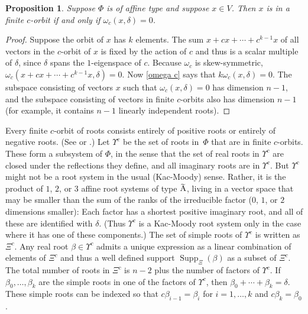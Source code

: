 \documentclass{amsart}
\newtheorem{proposition}{Proposition}[section]
\theoremstyle{definition}
\theoremstyle{remark}
\numberwithin{equation}{section}
\newcommand{\0}{{\mathbf{0}}}
\newcommand{\RSChar}{\Phi}
\newcommand{\RS}{\RSChar}
\newcommand{\RSTChar}{\Upsilon}
\newcommand{\RST}[1]{\RSTChar^{#1}}
\newcommand{\SimplesTChar}{\Xi}
\newcommand{\SimplesT}[1]{\SimplesTChar^{#1}}
\newcommand{\SuppT}{\operatorname{Supp}_\SimplesTChar}
\newcommand{\afftype}[1]{{\widetilde{\raisebox{0pt}[6pt][0pt]{#1}}}}
\begin{document}

\begin{proposition}\label{om del fin}
Suppose $\RS$ is of affine type and suppose $x\in V$.
Then $x$ is in a finite $c$-orbit if and only if $\omega_c(x,\delta)=0$.
\end{proposition}
\begin{proof}
Suppose the orbit of $x$ has $k$ elements.
The sum $x+cx+\cdots+c^{k-1}x$ of all vectors in the $c$-orbit of $x$ is fixed by the action of $c$ and thus is a scalar multiple of $\delta$, since $\delta$ spans the $1$-eigenspace of $c$.
Because $\omega_c$ is skew-symmetric, $\omega_c(x+cx+\cdots+c^{k-1}x,\delta)=0$.
Now \cref{omega c} says that $k\omega_c(x,\delta)=0$.
The subspace consisting of vectors $x$ such that $\omega_c(x,\delta)=0$ has dimension $n-1$, and the subspace consisting of vectors in finite $c$-orbits also has dimension $n-1$ (for example, it contains $n-1$ linearly independent roots).
\end{proof}


Every finite $c$-orbit of roots consists entirely of positive roots or entirely of negative roots.
(See \cite[Chapter~1]{Dlab-Ringel} or \cite[Theorem~1.2(5)]{afforb}.)
Let $\RST{c}$ be the set of roots in~$\RS$ that are in finite $c$-orbits.
These form a subsystem of $\RS$, in the sense that the set of real roots in $\RST{c}$ are closed under the reflections they define, and all imaginary roots are in $\RST{c}$.
But $\RST{c}$ might not be a root system in the usual (Kac-Moody) sense.
Rather, it is the product of $1$, $2$, or $3$ affine root systems of type $\afftype{A}$, living in a vector space that may be smaller than the sum of the ranks of the irreducible factor ($0$, $1$, or $2$ dimensions smaller):
Each factor has a shortest positive imaginary root, and all of these are identified with $\delta$.
(Thus $\RST{c}$ is a Kac-Moody root system only in the case where it has one of these components.)
The set of simple roots of $\RST{c}$ is written as $\SimplesT{c}$.
Any real root $\beta\in\RST{c}$ admits a unique expression as a linear combination of elements of $\SimplesT{c}$ and thus a well defined support $\SuppT(\beta)$ as a subset of $\SimplesT{c}$.
The total number of roots in $\SimplesT{c}$ is $n-2$ plus the number of factors of $\RST{c}$.
If $\beta_0,\ldots,\beta_k$ are the simple roots in one of the factors of $\RST{c}$, then $\beta_0+\cdots+\beta_k=\delta$.
These simple roots can be indexed so that $c\beta_{i-1}=\beta_i$ for $i=1,\ldots,k$ and $c\beta_k=\beta_0$.
\end{document}

